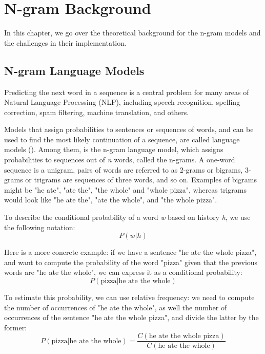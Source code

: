 \chapter{N-gram Background}
\label{chap:NgramBackground}

In this chapter, we go over the theoretical background for the n-gram models and the challenges in their implementation.

\section{N-gram Language Models}
\label{sec:NgramBackground-LanguageModels}
Predicting the next word in a sequence is a central problem for many areas of Natural Language Processing (NLP), including speech recognition, spelling correction, spam filtering, machine translation, and others.

Models that assign probabilities to sentences or sequences of words, and can be used to find the most likely continuation of a sequence, are called language models (\cite{Jura09a}). Among them, is the n-gram language model, which assigns probabilities to sequences out of \textit{n} words, called the n-grams. A one-word sequence is a unigram, pairs of words are referred to as 2-grams or bigrams, 3-grams or trigrams are sequences of three words, and so on. Examples of bigrams might be "he ate", "ate the", "the whole" and "whole pizza", whereas trigrams would look like "he ate the", "ate the whole", and "the whole pizza".

To describe the conditional probability of a word \textit{w} based on history \textit{h}, we use the following notation:
\begin{equation}
    P(w|h)
\end{equation}

Here is a more concrete example: if we have a sentence "he ate the whole pizza", and want to compute the probability of the word "pizza" given that the previous words are "he ate the whole", we can express it as a conditional probability:
\begin{equation}
    P(\text{pizza}|\text{he ate the whole})
\end{equation}

To estimate this probability, we can use relative frequency: we need to compute the number of occurrences of "he ate the whole", as well the number of occurrences of the sentence "he ate the whole pizza", and divide the latter by the former:
\begin{equation}
    P(\text{pizza}|\text{he ate the whole})=\frac{C(\text{he ate the whole pizza})}{C(\text{he ate the whole})}
\end{equation}

